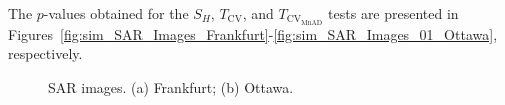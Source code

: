 \documentclass[remotesensing,article,submit,moreauthors,pdftex]{Definitions/mdpi}
\begin{document}
The \(p\)-values obtained for the \(S_H\), \(T_{\text{CV}}\), and
\(T_{\text{CV}_{\text{MnAD}}}\) tests are presented in
Figures~\ref{fig:sim_SAR_Images_Frankfurt}-\ref{fig:sim_SAR_Images_01_Ottawa},
respectively.

\begin{figure}[H]

{\centering {}

}

\caption{SAR images. (a) Frankfurt; (b) Ottawa. }\label{fig:real_SAR_Images_coe}
\end{figure}
\end{document}

